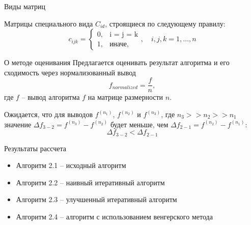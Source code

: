 \documentclass[12pt]{beamer}
\begin{document}
\begin{frame}{Виды матриц}

Матрицы специального вида $C_{id}$, строящиеся по следующему правилу:
\begin{equation}
c_{ijk} = 
\begin{cases} 
	0, 		&\mbox{i = j = k}  \\
	1,		&\mbox{иначе, }
\end{cases},\quad i,j,k= 1, \ldots, n 
\end{equation}
\end{frame}

\begin{frame}{О методе оценивания}
Предлагается оценивать результат алгоритма и его сходимость через нормализованный вывод 
\begin{equation}
f_{normalized} = \frac{f}{n},
\end{equation} где $f$ -- вывод алгоритма $f$ на матрице размерности $n$.

Ожидается, что для выводов $f^{(n_1)}$, $f^{(n_2)}$ и $f^{(n_3)}$, где $n_3 >> n_2 >> n_1$ значение $\Delta f_{3-2} = f^{(n_3)} - f^{(n_2)}$ будет меньше, чем $\Delta  f_{2-1} = f^{(n_2)} - f^{(n_1)}$:
\begin{equation}
\Delta f_{3-2} < \Delta f_{2-1}
\end{equation}
\end{frame}

\begin{frame}{Результаты рассчета}
\begin{itemize}
\item Алгоритм 2.1  -- исходный алгоритм
\item Алгоритм 2.2 -- наивный итеративный алгоритм
\item Алгоритм 2.3 -- улучшенный итеративный алгоритм
\item Алгоритм 2.4 -- алгоритм с использованием венгерского метода
\end{itemize}

\end{frame}
\end{document}

